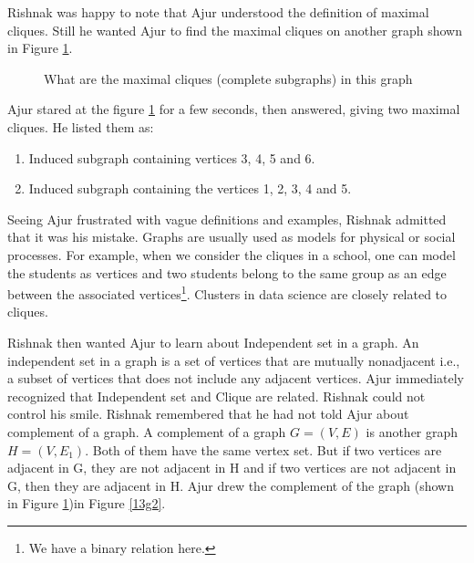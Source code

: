 Rishnak was happy to note that Ajur understood the definition of maximal cliques. Still he wanted Ajur to find the
maximal cliques on another graph shown in Figure \ref{13g21}.
\begin{figure}
\begin{center}
\caption{ What are the maximal cliques (complete subgraphs) in this graph}\label{13g21}
\end{center}
\end{figure}

Ajur stared at the figure \ref{13g21} for a few seconds, then answered, giving two maximal cliques. He listed them as: 
\begin{enumerate}
    \item Induced subgraph containing vertices 3, 4, 5 and 6.
    \item Induced subgraph containing the vertices 1, 2, 3, 4 and 5.
\end{enumerate} 
Seeing Ajur  frustrated with vague definitions and examples, Rishnak admitted that it was his mistake. Graphs are usually used as models for physical or social processes. For example, when we consider the cliques in a school, one can model the students as vertices and two students belong to the same group as an edge between the associated vertices\footnote{We have a binary relation here.}. Clusters in data science are closely related to cliques.

Rishnak then wanted Ajur to learn about Independent set in a graph. An independent set in a graph is a set of vertices that are mutually nonadjacent i.e., a subset of vertices that does not include any adjacent vertices. Ajur immediately recognized that Independent set and Clique are related. Rishnak could not control his smile. Rishnak remembered that he had not told Ajur about complement of a graph. A complement of a graph $G=(V,E)$ is another graph $H=(V,E_1)$. Both of them have the same vertex set. But if two vertices are adjacent in G, they are not adjacent in H and if two vertices are not adjacent in G, then they are adjacent in H. Ajur drew the complement of the graph (shown in Figure \ref{13g21})in Figure \ref{13g2}.

